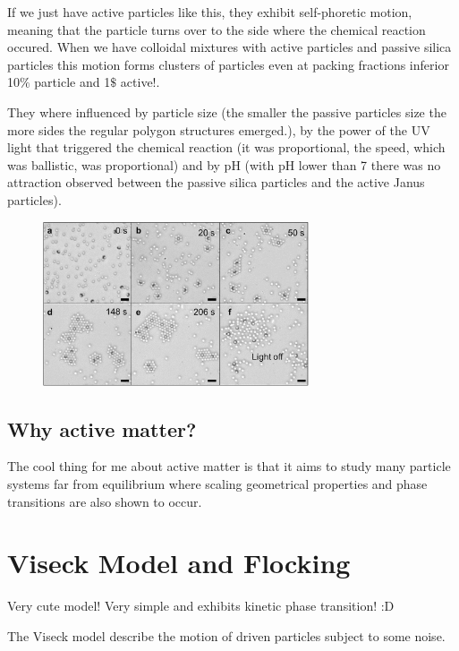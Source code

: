 \documentclass[a4paper]{article}
\begin{document}
If we just have active particles like this, they exhibit self-phoretic motion, meaning that the particle turns over to the side where the chemical reaction occured. When we have colloidal mixtures with active particles and passive silica particles this motion forms clusters of particles even at packing fractions inferior 10$\%$ particle and 1$\$$ active!. 

They where influenced by particle size (the smaller the passive particles size the more sides the regular polygon structures emerged.), by the power of the UV light that triggered the chemical reaction (it was proportional, the speed, which was ballistic, was proportional) and by pH (with pH lower than 7 there was no attraction observed between the passive silica particles and the active Janus particles).

\begin{figure}
	\centering
	\includegraphics[width=0.7\textwidth]{singh-particles.jpg}
\end{figure}

\subsection{Why active matter?}

The cool thing for me about active matter is that it aims to study many particle systems far from equilibrium where scaling geometrical properties and phase transitions are also shown to occur.

\section{Viseck Model and Flocking}

Very cute model! Very simple and exhibits kinetic phase transition! :D

The Viseck model describe the motion of driven particles subject to some noise. 
\end{document}
